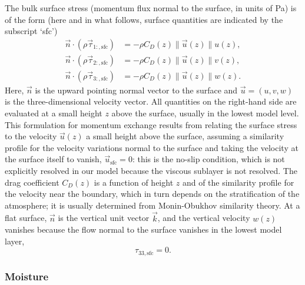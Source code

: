\documentclass{article}
\begin{document}
The bulk surface stress (momentum flux normal to the surface, in units of Pa) is of the form (here and in what follows, surface quantities are indicated by the subscript `sfc')
\begin{subequations}
\begin{align}
\vec{n} \cdot (\rho\vec{\tau}_{1:, \mathrm{sfc}}) & = -\rho C_D(z) \|\vec{u}(z)\| u(z), \\
\vec{n} \cdot (\rho\vec{\tau}_{2:, \mathrm{sfc}}) & = -\rho C_D(z) \|\vec{u}(z)\| v(z),\\
\vec{n} \cdot (\rho\vec{\tau}_{3:, \mathrm{sfc}}) & = -\rho C_D(z) \|\vec{u}(z)\| w(z).
\end{align}
\end{subequations}
Here, $\vec{n}$ is the upward pointing normal vector to the surface and $\vec{u} = (u, v, w)$ is the three-dimensional velocity vector. All quantities on the right-hand side are evaluated at a small height $z$ above the surface, usually in the lowest model level. This formulation for momentum exchange results from relating the surface stress to the velocity $\vec{u}(z)$ a small height above the surface, assuming a similarity profile for the velocity variations normal to the surface and taking the velocity at the surface itself to vanish, $\vec{u}_\mathrm{sfc} =0$: this is the no-slip condition, which is not explicitly resolved in our model because the viscous sublayer is not resolved. The drag coefficient  $C_D(z)$ is a function of height $z$ and of the similarity profile for the velocity near the boundary, which in turn depends on the stratification of the atmosphere; it is usually determined from Monin-Obukhov similarity theory. At a flat surface, $\vec{n}$ is the vertical unit vector $\vec{k}$, and the vertical velocity $w(z)$ vanishes because the flow normal to the surface vanishes in the lowest model layer,
\[
\tau_{33, \mathrm{sfc}} = 0.
\]

\subsubsection{Moisture} 
\end{document}
